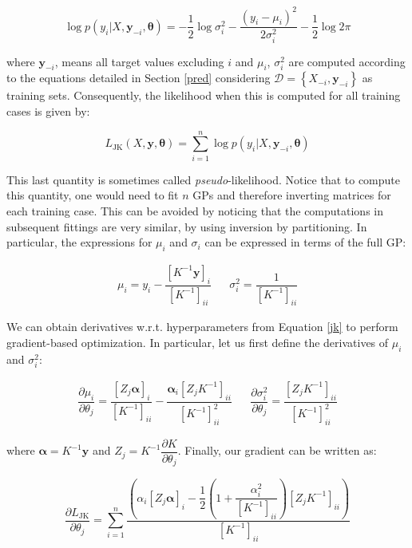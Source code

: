 \documentclass[10pt,a4paper,twoside]{book}
\begin{document}
\begin{equation}
\log p(y_i |X, \boldsymbol{y}_{-i}, \boldsymbol{\theta}) = -\dfrac{1}{2}\log \sigma_i^2 - \dfrac{(y_i - \mu_i)^2}{2\sigma_i^2} - \dfrac{1}{2}\log 2\pi
\end{equation}

where $\boldsymbol{y}_{-i}$, means all target values excluding $i$ and $\mu_i$, $\sigma^2_i$ are computed according to the equations detailed in Section \ref{pred} considering $\mathcal{D} = \left\lbrace X_{-i}, \boldsymbol{y}_{-i} \right\rbrace$ as training sets. Consequently, the likelihood when this is computed for all training cases is given by:

\begin{equation}
\label{jk}
L_{\mathrm{JK}}(X, \boldsymbol{y}, \boldsymbol{\theta}) = \sum_{i=1}^n \log p(y_i|X, \boldsymbol{y}_{-i}, \boldsymbol{\theta})
\end{equation}

This last quantity is sometimes called \textit{pseudo}-likelihood. Notice that to compute this quantity, one would need to fit $n$ GPs and therefore inverting matrices for each training case. This can be avoided by noticing that the computations in subsequent fittings are very similar, by using inversion by partitioning. In particular, the expressions for $\mu_i$ and $\sigma_i$ can be expressed in terms of the full GP:

\begin{align}
\mu_i = y_i - \dfrac{[K^{-1}\boldsymbol{y}]_i}{[K^{-1}]_{ii}} && \sigma^2_i = \dfrac{1}{[K^{-1}]_{ii}}
\end{align}

We can obtain derivatives w.r.t. hyperparameters from Equation \ref{jk} to perform gradient-based optimization. In particular, let us first define the derivatives of $\mu_i$ and $\sigma_i^2$:

\begin{align}
\dfrac{\partial \mu_i}{\partial \theta_j} = \dfrac{[Z_j \boldsymbol{\alpha}]_i}{[K^{-1}]_{ii}} - \dfrac{\boldsymbol{\alpha}_i[Z_j K^{-1}]_{ii}}{[K^{-1}]^2_{ii}} && 
\dfrac{\partial \sigma_i^2}{\partial \theta_j} = \dfrac{[Z_j K^{-1}]_{ii}}{[K^{-1}]^2_{ii}}
\end{align}

where $\boldsymbol{\alpha} = K^{-1}\boldsymbol{y}$ and $Z_j = K^{-1}\dfrac{\partial K}{\partial \theta_j}$. Finally, our gradient can be written as:

\begin{equation}
\dfrac{\partial L_{\mathrm{JK}}}{\partial \theta_j} = \sum_{i=1}^n \dfrac{\left(\alpha_i [Z_j\boldsymbol{\alpha}]_i - \dfrac{1}{2}\left( 1 + \dfrac{\alpha_i^2}{[K^{-1}]_{ii}} \right) [Z_j K^{-1}]_{ii}  \right)}{[K^{-1}]_{ii}}
\end{equation}
\end{document}
